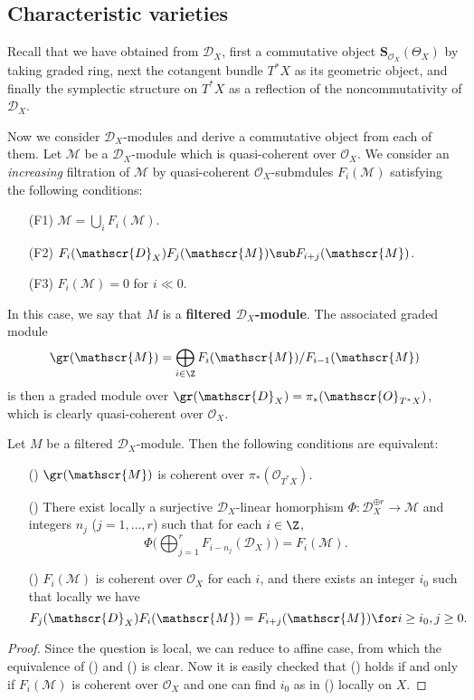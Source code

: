 \subsection{Characteristic varieties}
Recall that we have obtained from $\mathscr{D}_X$, first a commutative object $\bm{S}_{\mathscr{O}_X}(\Theta_X)$ by taking graded ring, next the cotangent bundle $T^*X$ as its geometric object, and finally the symplectic structure on $T^*X$ as a reflection of the noncommutativity of $\mathscr{D}_X$.\par
Now we consider $\mathscr{D}_X$-modules and derive a commutative object from each of them. Let $\mathscr{M}$ be a $\mathscr{D}_X$-module which is quasi-coherent over $\mathscr{O}_X$. We consider an \textit{increasing} filtration of $\mathscr{M}$ by quasi-coherent $\mathscr{O}_X$-submdules $F_i(\mathscr{M})$ satisfying the following conditions:
\begin{enumerate}[leftmargin=40pt]
    \item[(F1)] $\mathscr{M}=\bigcup_iF_i(\mathscr{M})$.
    \item[(F2)] $F_i(\mathscr{D}_X)F_j(\mathscr{M})\sub F_{i+j}(\mathscr{M})$.
    \item[(F3)] $F_i(\mathscr{M})=0$ for $i\ll 0$.  
\end{enumerate}
In this case, we say that $M$ is a \textbf{filtered $\mathscr{D}_X$-module}. The associated graded module
\[\gr(\mathscr{M})=\bigoplus_{i\in\Z}F_i(\mathscr{M})/F_{i-1}(\mathscr{M})\]
is then a graded module over $\gr(\mathscr{D}_X)=\pi_*(\mathscr{O}_{T^*X})$, which is clearly quasi-coherent over $\mathscr{O}_X$.

\begin{proposition}\label{D-module good filtration iff}
Let $M$ be a filtered $\mathscr{D}_X$-module. Then the following conditions are equivalent:
\begin{enumerate}
    \item[(\rmnum{1})] $\gr(\mathscr{M})$ is coherent over $\pi_*(\mathscr{O}_{T^*X})$.
    \item[(\rmnum{2})] There exist locally a surjective $\mathscr{D}_X$-linear homorphism $\Phi:\mathscr{D}_X^{\oplus r}\to\mathscr{M}$ and integers $n_j$ ($j=1,\dots,r$) such that for each $i\in\Z$,
    \[\Phi\Big(\bigoplus_{j=1}^{r}F_{i-n_j}(\mathscr{D}_X)\Big)=F_i(\mathscr{M}).\]
    \item[(\rmnum{3})] $F_i(\mathscr{M})$ is coherent over $\mathscr{O}_X$ for each $i$, and there exists an integer $i_0$ such that locally we have
    \[F_j(\mathscr{D}_X)F_i(\mathscr{M})=F_{i+j}(\mathscr{M})\for i\geq i_0,j\geq 0.\]
\end{enumerate}
\end{proposition}
\begin{proof}
Since the question is local, we can reduce to affine case, from which the equivalence of () and () is clear. Now it is easily checked that () holds if and only if $F_i(\mathscr{M})$ is coherent over $\mathscr{O}_X$ and one can find $i_0$ as in () locally on $X$.
\end{proof}

